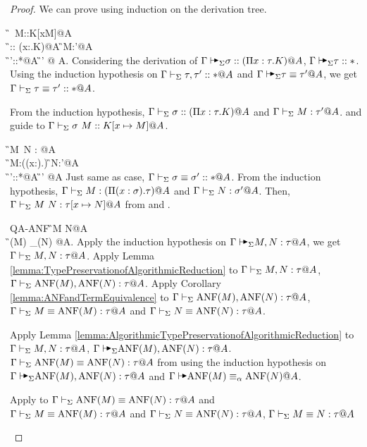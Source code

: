 \begin{proof}
    We can prove using induction on the derivation tree.
    \begin{rneqncase}{\KAApp{}}{
            \G\AVS \sigma\ M::K[x\mapsto M]@A \\
            \G\AVS \sigma:: (\Pi x:\tau.K)@A \text{ , }
            \G\AVS M:\tau'@A \text{ , } \\
            \G\AVS\tau'::*@A  
            \G\AVS \tau \E \tau' @ A.
        }
        Considering the derivation of \( \G\AVS \sigma:: (\Pi x:\tau.K)@A \), \( \G \AVS \tau::* \).
        Using the induction hypothesis on \( \Gamma \vdash_\Sigma \tau, \tau'::* @ A \) and \( \G\AVS \tau \E \tau' @ A \),
        we get \( \Gamma\vdash_\Sigma \tau \equiv \tau' :: * @ A \).

        From the induction hypothesis, \( \Gamma\vdash_\Sigma \sigma:: (\Pi x:\tau.K)@A \) and \( \Gamma\vdash_\Sigma M:\tau'@A \).
        \TConv and \KApp guide to \( \G\V \sigma\ M::K[x\mapsto M]@A \).

    \end{rneqncase}
    \begin{rneqncase}{\TAApp}{
            \G\AVS M\ N : \tau[x\mapsto N]@A \\
            \G\AVS M:(\Pi (x:\sigma).\tau) \text{ , }
            \G\AVS N:\sigma'@A \text{ , } \\
            \G\AVS \sigma'::*@A 
            \G\AVS \sigma\E\sigma' @A
        }
        Just same as \KApp case, \( \Gamma\vdash_\Sigma \sigma\equiv\sigma' :: * @A \).
        From the induction hypothesis, \( \Gamma\vdash_\Sigma M:(\Pi (x:\sigma).\tau) @ A\) and \( \Gamma\vdash_\Sigma N:\sigma'@A \).
        Then, \( \Gamma\vdash_\Sigma M\ N : \tau[x\mapsto N]@A \) from \TConv and \TApp.
    \end{rneqncase}
    \begin{rneqncase}{\textsc{QA-ANF}}{
            \G \AV M \E N@A \\
            \G \AV \ANF(M) \E_\alpha \ANF(N) @A.
        }
        Apply the induction hypothesis on \( \G \AVS M, N : \tau @ A \), we get \( \Gamma \vdash_\Sigma M, N : \tau @ A \).
        Apply Lemma \ref{lemma:TypePreservationofAlgorithmicReduction} to \( \Gamma \vdash_\Sigma M, N : \tau @ A \), \( \Gamma \vdash_\Sigma \text{ANF}(M), \text{ANF}(N) : \tau @ A \).
        Apply Corollary \ref{lemma:ANFandTermEquivalence} to \( \Gamma \vdash_\Sigma \text{ANF}(M), \text{ANF}(N) : \tau @ A \), \( \Gamma \vdash_\Sigma M \equiv \text{ANF}(M) : \tau @ A \) and \( \Gamma \vdash_\Sigma N \equiv \text{ANF}(N) : \tau @ A \).

        Apply Lemma \ref{lemma:AlgorithmicTypePreservationofAlgorithmicReduction} to \( \Gamma \vdash_\Sigma M, N : \tau @ A \), \( \G \AVS \ANF(M), \ANF(N) : \tau @ A \).
        \( \Gamma \vdash_\Sigma \text{ANF}(M) \equiv \text{ANF}(N) : \tau @ A \) from using the induction hypothesis on \( \G \AVS \ANF(M), \ANF(N) : \tau @ A \) and \( \G \AV \ANF(M) \E_\alpha \ANF(N) @A \).

        Apply \QTrans to \( \Gamma \vdash_\Sigma \text{ANF}(M) \equiv \text{ANF}(N) : \tau @ A \) and \\ \({ \Gamma \vdash_\Sigma M \equiv \text{ANF}(M) : \tau @ A }\) and \( \Gamma \vdash_\Sigma N \equiv \text{ANF}(N) : \tau @ A \), \( \Gamma \vdash_\Sigma M \equiv N : \tau @ A \)
    \end{rneqncase}
\end{proof}

